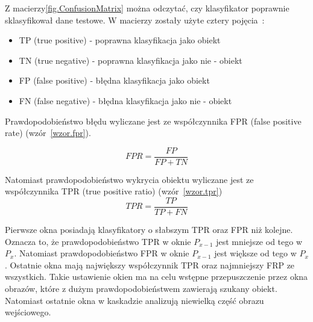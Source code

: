 \documentclass[a4paper,twoside,12pt]{book}
\begin{document}
    Z macierzy\ref{fig.ConfusionMatrix} można odczytać, czy klasyfikator poprawnie sklasyfikował dane testowe.
    W macierzy zostały użyte cztery pojęcia~\cite{dataMiningAlgorithms}:
    \begin{itemize}
        \item TP (true positive) - poprawna klasyfikacja jako obiekt
        \item TN (true negative) - poprawna klasyfikacja jako nie - obiekt
        \item FP (false positive) - błędna klasyfikacja jako obiekt
        \item FN (false negative) - błędna klasyfikacja jako nie - obiekt
    \end{itemize}

    Prawdopodobieństwo błędu wyliczane jest ze współczynnika FPR (false positive rate) (wzór~\ref{wzor.fpr}).

    \large
    \begin{equation}
        FPR= \frac{FP}{FP+TN}
        \label{wzor.fpr}
    \end{equation}
    \normalsize

    Natomiast prawdopodobieństwo wykrycia obiektu wyliczane jest ze współczynnika TPR (true positive ratio)
    (wzór~\ref{wzor.tpr})
    \large
    \begin{equation}
        TPR= \frac{TP}{TP+FN}
        \label{wzor.tpr}
    \end{equation}
    \normalsize

    Pierwsze okna posiadają klasyfikatory o słabszym TPR oraz FPR niż kolejne.
    Oznacza to, że prawdopodobieństwo TPR w oknie $P_{x-1}$ jest mniejsze od tego w $P_{x}$.
    Natomiast prawdopodobieństwo FPR w oknie $P_{x-1}$ jest większe od tego w $P_{x}$.
    Ostatnie okna mają największy współczynnik TPR oraz najmniejszy FRP ze wszystkich.
    Takie ustawienie okien ma na celu wstępne przepuszczenie przez okna obrazów,
    które z dużym prawdopodobieństwem zawierają szukany obiekt.
    Natomiast ostatnie okna w kaskadzie analizują niewielką część obrazu wejściowego.
\end{document}
